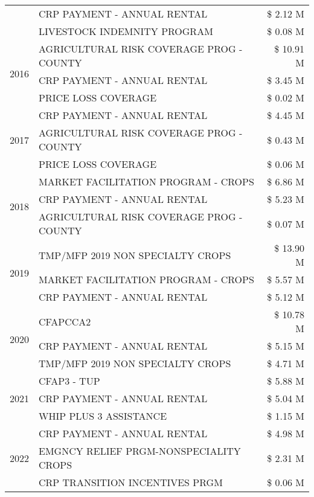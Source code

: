 \begin{tabular}{llr}
 & CRP PAYMENT - ANNUAL RENTAL & \$ 2.12 M \\
 & LIVESTOCK INDEMNITY PROGRAM & \$ 0.08 M \\
\cline{1-3}
\multirow[t]{3}{*}{2016} & AGRICULTURAL RISK COVERAGE PROG - COUNTY & \$ 10.91 M \\
 & CRP PAYMENT - ANNUAL RENTAL & \$ 3.45 M \\
 & PRICE LOSS COVERAGE & \$ 0.02 M \\
\cline{1-3}
\multirow[t]{3}{*}{2017} & CRP PAYMENT - ANNUAL RENTAL & \$ 4.45 M \\
 & AGRICULTURAL RISK COVERAGE PROG - COUNTY & \$ 0.43 M \\
 & PRICE LOSS COVERAGE & \$ 0.06 M \\
\cline{1-3}
\multirow[t]{3}{*}{2018} & MARKET FACILITATION PROGRAM - CROPS & \$ 6.86 M \\
 & CRP PAYMENT - ANNUAL RENTAL & \$ 5.23 M \\
 & AGRICULTURAL RISK COVERAGE PROG - COUNTY & \$ 0.07 M \\
\cline{1-3}
\multirow[t]{3}{*}{2019} & TMP/MFP 2019 NON SPECIALTY CROPS & \$ 13.90 M \\
 & MARKET FACILITATION PROGRAM - CROPS & \$ 5.57 M \\
 & CRP PAYMENT - ANNUAL RENTAL & \$ 5.12 M \\
\cline{1-3}
\multirow[t]{3}{*}{2020} & CFAPCCA2 & \$ 10.78 M \\
 & CRP PAYMENT - ANNUAL RENTAL & \$ 5.15 M \\
 & TMP/MFP 2019 NON SPECIALTY CROPS & \$ 4.71 M \\
\cline{1-3}
\multirow[t]{3}{*}{2021} & CFAP3 - TUP & \$ 5.88 M \\
 & CRP PAYMENT - ANNUAL RENTAL & \$ 5.04 M \\
 & WHIP PLUS 3 ASSISTANCE & \$ 1.15 M \\
\cline{1-3}
\multirow[t]{3}{*}{2022} & CRP PAYMENT - ANNUAL RENTAL & \$ 4.98 M \\
 & EMGNCY RELIEF PRGM-NONSPECIALITY CROPS & \$ 2.31 M \\
 & CRP TRANSITION INCENTIVES PRGM & \$ 0.06 M \\
\cline{1-3}
\bottomrule
\end{tabular}
